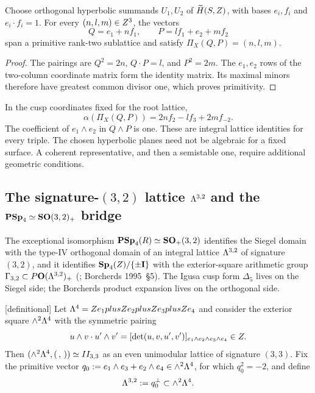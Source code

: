 \begin{lemma}
\label{lem:two-hyperbolic-planes-appA}
Choose orthogonal hyperbolic summands $U_1,U_2$ of
$\widetilde H(S,Z)$, with bases $e_i,f_i$ and $e_i\cdot f_i=1$.
For every $(n,l,m)\in Z^3$, the vectors
\[
Q=e_1+nf_1,\qquad P=lf_1+e_2+mf_2
\]
span a primitive rank-two sublattice and satisfy
$\Pi_X(Q,P)=(n,l,m)$.
\end{lemma}

\begin{proof}
The pairings are $Q^2=2n$, $Q\cdot P=l$, and $P^2=2m$.
The $e_1,e_2$ rows of the two-column coordinate matrix form the
identity matrix.  Its maximal minors therefore have greatest common
divisor one, which proves primitivity.
\end{proof}

\begin{verification}
\label{ver:formal-primitive-lift-packet-appA}
In the cusp coordinates fixed for the root lattice,
\[
\alpha(\Pi_X(Q,P))=2nf_2-lf_3+2mf_{-2}.
\]
The coefficient of $e_1\wedge e_2$ in $Q\wedge P$ is one.  These
are integral lattice identities for every triple.  The chosen hyperbolic planes need not be algebraic for a fixed
surface.  A coherent representative, and then a semistable one,
require additional geometric conditions.
\end{verification}

\subsection{The signature-$(3,2)$ lattice $\Lambda^{3,2}$ and the
$\mathbf{PSp}_4\simeq\mathbf{SO}(3,2)_+$ bridge}
\label{app:lattice-32}

The exceptional isomorphism $\mathbf{PSp}_4(R)\simeq\mathbf{SO}_+(3,2)$ identifies
the Siegel domain with the type-IV orthogonal domain of an integral
lattice $\Lambda^{3,2}$ of signature $(3,2)$, and it identifies
\(\mathbf{Sp}_4(Z)/\{\pm\mathbf{I}\}\) with the exterior-square arithmetic group
\(\Gamma_{3,2}\subset P\mathbf{O}(\Lambda^{3,2})_+\)
(\cite[Section~3]{GN}; Borcherds 1995~\S5).  The Igusa cusp form
$\Delta_5$ lives on the Siegel side; the Borcherds product expansion
lives on the orthogonal side.

\begin{definition}
\label{def:lambda-32}
\textnormal{[definitional]}
Let $\Lambda^4=Z e_1plusZ e_2plusZ e_3plusZ e_4$ and consider
the exterior square $\wedge^2\Lambda^4$ with the symmetric pairing
\[
u\wedge v\cdot u'\wedge v'=
[\det(u,v,u',v')]_{e_1\wedge e_2\wedge e_3\wedge e_4}\in Z.
\]
Then $(\wedge^2\Lambda^4,(\,,\,))\simeq II_{3,3}$ as an even
unimodular lattice of signature $(3,3)$.  Fix the primitive vector
$q_0:=e_1\wedge e_3+e_2\wedge e_4\in\wedge^2\Lambda^4$, for which
$q_0^2=-2$, and define
\[
\Lambda^{3,2}:=q_0^\perp\subset\wedge^2\Lambda^4.
\]
\end{definition}

